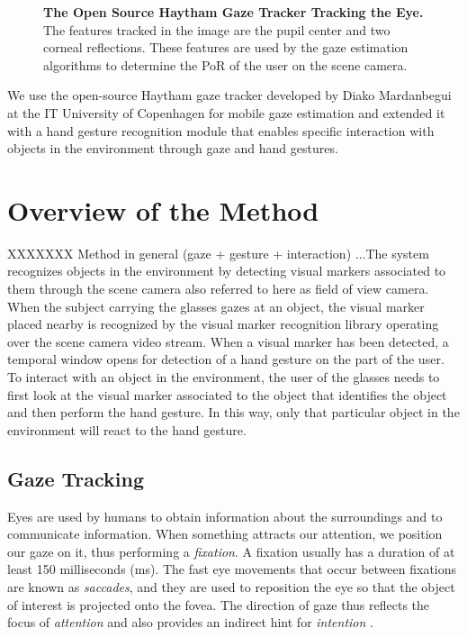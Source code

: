 \documentclass[jou,a4paper,notxfonts]{apa}
\begin{document}
\begin{figure}[tp]
 \caption{\textbf{The Open Source Haytham Gaze Tracker Tracking the Eye.} The
features tracked in the image are the pupil center and two corneal reflections. These features are 
used by the gaze estimation algorithms to determine the PoR of the user on the scene camera.}
 \label{screenGazeTracker}
\end{figure}



We use the open-source Haytham \cite{Mardanbegi2011} gaze tracker developed by Diako Mardanbegui at the IT University of
Copenhagen for mobile gaze estimation and extended it with a hand gesture recognition module that enables specific
interaction with objects in the environment through gaze and hand gestures.


\section{Overview of the Method}


XXXXXXX Method in general (gaze + gesture + interaction)
...The system recognizes objects in the environment by detecting visual markers associated to them through the scene camera also referred to here as field of view camera. When the subject carrying the glasses gazes at an object, the visual marker placed nearby is recognized by the visual marker recognition library operating over the scene camera video stream. When a visual marker has been detected, a temporal window opens for detection of a hand gesture on the part of the user. To interact with an object in the environment, the user of the glasses needs to first look at the visual marker associated to the object that identifies the object and then perform the hand gesture. In this way, only that particular object in the environment will react to the hand gesture.


\subsection{Gaze Tracking}
Eyes are used by humans to obtain information about the surroundings and to communicate information. When something
attracts our attention, we position our gaze on it, thus performing a \textit{fixation}. A fixation usually has a
duration of at least 150 milliseconds (ms). The fast eye movements that occur between fixations are known as
\textit{saccades}, and they are used to reposition the eye so that the object of interest is projected onto the fovea.
The direction of gaze thus reflects the focus of \textit{attention} and also provides an indirect hint for
\textit{intention} \cite{velichkovsky}.
\end{document}
